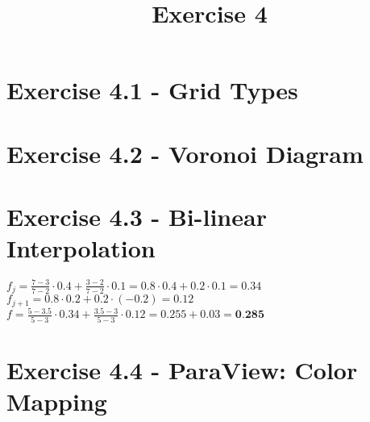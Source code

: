 \documentclass[a4paper]{article}
\date{}
\author{}
\title{Exercise 4}
\begin{document}
	
	\maketitle 
	\thispagestyle{fancy}
	

	
	\section*{Exercise 4.1 - Grid Types}
	
	\section*{Exercise 4.2 - Voronoi Diagram}
	
	\section*{Exercise 4.3 - Bi-linear Interpolation}
	
	$f_{j} = \frac{7 - 3}{7 - 2} \cdot 0.4 + \frac{3 - 2}{7 - 2} \cdot 0.1 = 0.8 \cdot 0.4 + 0.2 \cdot 0.1 = 0.34$ \\ \linebreak
	$f_{j + 1}  = 0.8 \cdot 0.2 + 0.2 \cdot (-0.2) = 0.12$ \\ \linebreak
	$f = \frac{5 - 3.5}{5 - 3} \cdot 0.34 + \frac{3.5 - 3}{5 - 3} \cdot 0.12 = 0.255 + 0.03 = \textbf{0.285}$
	
	\section*{Exercise 4.4 - ParaView: Color Mapping}
	
	
	
\end{document}
